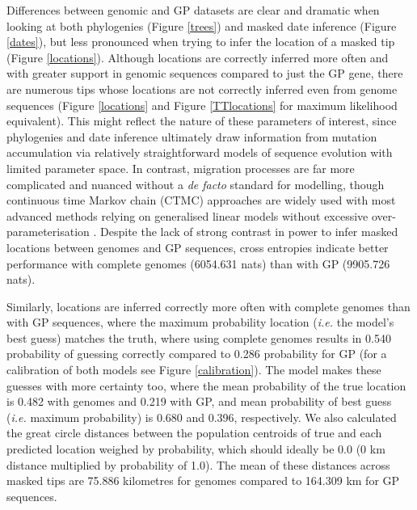 \documentclass{bmcart}
\begin{document}
Differences between genomic and GP datasets are clear and dramatic when looking at both phylogenies (Figure \ref{trees}) and masked date inference (Figure \ref{dates}), but less pronounced when trying to infer the location of a masked tip (Figure \ref{locations}).
Although locations are correctly inferred more often and with greater support in genomic sequences compared to just the GP gene, there are numerous tips whose locations are not correctly inferred even from genome sequences (Figure \ref{locations} and Figure \ref{TTlocations} for maximum likelihood equivalent).
This might reflect the nature of these parameters of interest, since phylogenies and date inference ultimately draw information from mutation accumulation via relatively straightforward models of sequence evolution with limited parameter space.
In contrast, migration processes are far more complicated and nuanced without a \textit{de facto} standard for modelling, though continuous time Markov chain (CTMC) approaches are widely used \cite{lemey_bayesian_2009} with most advanced methods relying on generalised linear models without excessive over-parameterisation \cite{faria_simultaneously_2013,lemey_unifying_2014,dudas_virus_2017}.
Despite the lack of strong contrast in power to infer masked locations between genomes and GP sequences, cross entropies indicate better performance with complete genomes (6054.631 nats) than with GP (9905.726 nats).

Similarly, locations are inferred correctly more often with complete genomes than with GP sequences, where the maximum probability location (\textit{i.e.} the model's best guess) matches the truth, where using complete genomes results in 0.540 probability of guessing correctly compared to 0.286 probability for GP (for a calibration of both models see Figure \ref{calibration}).
The model makes these guesses with more certainty too, where the mean probability of the true location is 0.482 with genomes and 0.219 with GP, and mean probability of best guess (\textit{i.e.} maximum probability) is 0.680 and 0.396, respectively.
We also calculated the great circle distances between the population centroids of true and each predicted location weighed by probability, which should ideally be 0.0 (0 km distance multiplied by probability of 1.0).
The mean of these distances across masked tips are 75.886 kilometres for genomes compared to 164.309 km for GP sequences.
\end{document}
